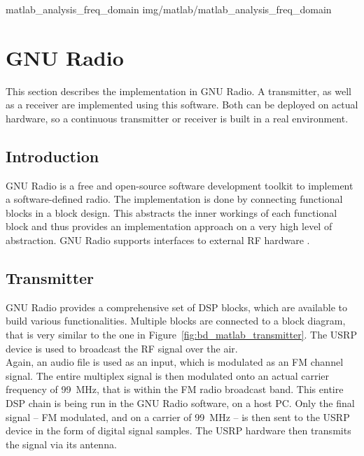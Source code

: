  {matlab_analysis_freq_domain} {img/matlab/matlab_analysis_freq_domain}

\section{GNU Radio}

This section describes the implementation in GNU Radio.
A transmitter, as well as a receiver are implemented using this software.
Both can be deployed on actual hardware, so a continuous transmitter or receiver is built in a real environment.

\subsection{Introduction}

GNU Radio is a free and open-source software development toolkit to implement a software-defined radio.
The implementation is done by connecting functional blocks in a block design.
This abstracts the inner workings of each functional block and thus provides an implementation approach on a very high level of abstraction.
GNU Radio supports interfaces to external RF hardware \cite{SoftwareGnuRadio}.

\subsection{Transmitter}

GNU Radio provides a comprehensive set of DSP blocks, which are available to build various functionalities.
Multiple blocks are connected to a block diagram, that is very similar to the one in Figure~\ref{fig:bd_matlab_transmitter}.
The USRP device is used to broadcast the RF signal over the air.\\

Again, an audio file is used as an input, which is modulated as an FM channel signal.
The entire multiplex signal is then modulated onto an actual carrier frequency of 99~MHz, that is within the FM radio broadcast band.
This entire DSP chain is being run in the GNU Radio software, on a host PC.
Only the final signal -- FM modulated, and on a carrier of 99~MHz -- is then sent to the USRP device in the form of digital signal samples.
The USRP hardware then transmits the signal via its antenna.\\

